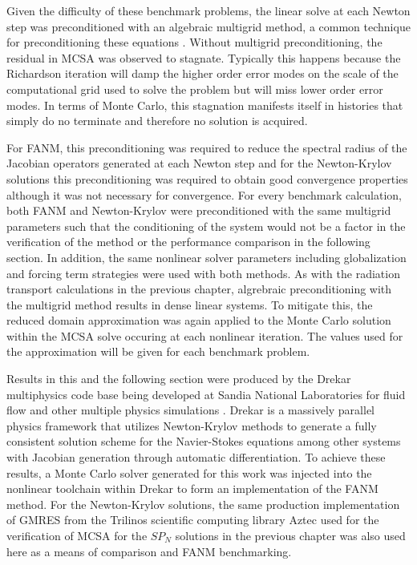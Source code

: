 Given the difficulty of these benchmark problems, the linear solve at
each Newton step was preconditioned with an algebraic multigrid
method, a common technique for preconditioning these equations
\citep{ghia_high-re_1982,evans_enhanced_2007}. Without multigrid
preconditioning, the residual in MCSA was observed to
stagnate. Typically this happens because the Richardson iteration will
damp the higher order error modes on the scale of the computational
grid used to solve the problem but will miss lower order error
modes. In terms of Monte Carlo, this stagnation manifests itself in
histories that simply do no terminate and therefore no solution is
acquired.

For FANM, this preconditioning was required to reduce the spectral
radius of the Jacobian operators generated at each Newton step and for
the Newton-Krylov solutions this preconditioning was required to
obtain good convergence properties although it was not necessary for
convergence. For every benchmark calculation, both FANM and
Newton-Krylov were preconditioned with the same multigrid parameters
such that the conditioning of the system would not be a factor in the
verification of the method or the performance comparison in the
following section. In addition, the same nonlinear solver parameters
including globalization and forcing term strategies were used with
both methods. As with the radiation transport calculations in the
previous chapter, algrebraic preconditioning with the multigrid method
results in dense linear systems. To mitigate this, the reduced domain
approximation was again applied to the Monte Carlo solution within the
MCSA solve occuring at each nonlinear iteration. The values used for
the approximation will be given for each benchmark problem.

Results in this and the following section were produced by the Drekar
multiphysics code base being developed at Sandia National Laboratories
for fluid flow and other multiple physics simulations
\citep{pawlowski_drekar_2012}. Drekar is a massively parallel physics
framework that utilizes Newton-Krylov methods to generate a fully
consistent solution scheme for the Navier-Stokes equations among other
systems with Jacobian generation through automatic differentiation. To
achieve these results, a Monte Carlo solver generated for this work
was injected into the nonlinear toolchain within Drekar to form an
implementation of the FANM method. For the Newton-Krylov solutions,
the same production implementation of GMRES from the Trilinos
scientific computing library Aztec \citep{heroux_overview_2005} used
for the verification of MCSA for the $SP_N$ solutions in the previous
chapter was also used here as a means of comparison and FANM
benchmarking.

